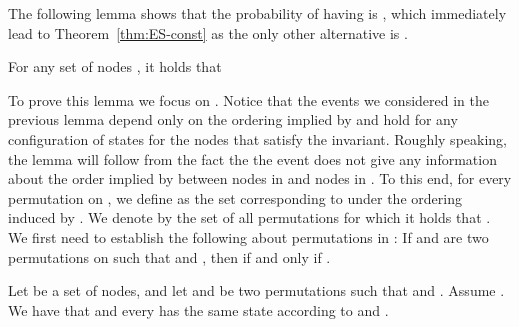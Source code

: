 The following lemma shows that the probability of having  is , which immediately lead to Theorem~\ref{thm:ES-const} as the only other alternative is . \begin{lem}
\label{lem:one-over-P}
For any set of nodes , it holds that 
\end{lem}


To prove this lemma we focus on . Notice that the events we considered in the previous lemma depend only on the ordering 
implied by  and hold for any configuration of states for the nodes that satisfy the \MIS invariant. Roughly speaking, the lemma 
will follow from the fact the the event  does not give any information about the order implied by  between nodes in  
and nodes in . To this end, for every permutation  on , we define  as the set corresponding to  under the ordering induced by . 
We denote by  the set of all permutations  for which it holds that . We first need to establish the 
following about permutations in : If  and  are two permutations on  such that  
and , then  if and only if .



\begin{claim}
\label{claim:u-in-barS}
Let  be a set of nodes, and let  and  be two permutations such that  and . Assume . We have that  and every  has the same state according to  and .
\end{claim}

